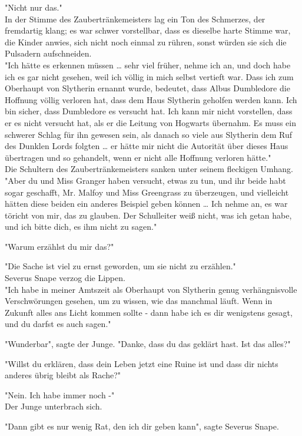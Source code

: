 {"Nicht nur das."\\ In der Stimme des Zaubertränkemeisters lag ein Ton des Schmerzes, der fremdartig klang; es war schwer vorstellbar, dass es dieselbe harte Stimme war, die Kinder anwies, sich nicht noch einmal zu rühren, sonst würden sie sich die Pulsadern aufschneiden.\\ "Ich hätte es erkennen müssen … sehr viel früher, nehme ich an, und doch habe ich es gar nicht gesehen, weil ich völlig in mich selbst vertieft war. Dass ich zum Oberhaupt von Slytherin ernannt wurde, bedeutet, dass Albus Dumbledore die Hoffnung völlig verloren hat, dass dem Haus Slytherin geholfen werden kann. Ich bin sicher, dass Dumbledore es versucht hat. Ich kann mir nicht vorstellen, dass er es nicht versucht hat, als er die Leitung von Hogwarts übernahm. Es muss ein schwerer Schlag für ihn gewesen sein, als danach so viele aus Slytherin dem Ruf des Dunklen Lords folgten … er hätte mir nicht die Autorität über dieses Haus übertragen und so gehandelt, wenn er nicht alle Hoffnung verloren hätte."\\ Die Schultern des Zaubertränkemeisters sanken unter seinem fleckigen Umhang. "Aber du und Miss Granger haben versucht, etwas zu tun, und ihr beide habt sogar geschafft, Mr. Malfoy und Miss Greengrass zu überzeugen, und vielleicht hätten diese beiden ein anderes Beispiel geben können … Ich nehme an, es war töricht von mir, das zu glauben. Der Schulleiter weiß nicht, was ich getan habe, und ich bitte dich, es ihm nicht zu sagen."

"Warum erzählst du mir das?"

"Die Sache ist viel zu ernst geworden, um sie nicht zu erzählen."\\ Severus Snape verzog die Lippen.\\ "Ich habe in meiner Amtszeit als Oberhaupt von Slytherin genug verhängnisvolle Verschwörungen gesehen, um zu wissen, wie das manchmal läuft. Wenn in Zukunft alles ans Licht kommen sollte - dann habe ich es dir wenigstens gesagt, und du darfst es auch sagen."

"Wunderbar", sagte der Junge. "Danke, dass du das geklärt hast. Ist das alles?"

"Willst du erklären, dass dein Leben jetzt eine Ruine ist und dass dir nichts anderes übrig bleibt als Rache?"

"Nein. Ich habe immer noch -"\\ Der Junge unterbrach sich.

"Dann gibt es nur wenig Rat, den ich dir geben kann", sagte Severus Snape.

}
